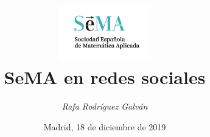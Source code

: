 \title{\includegraphics[width=0.3\textwidth]{img/logosema.png}
  \vspace{-.5em}
  \\
  SeMA en redes sociales}
\subtitle{}
\author{\textit{Rafa Rodríguez Galván}}
\date{Madrid, 18 de diciembre de 2019} %
\newcommand{\twitterhandle}{sema\_XYZ}
